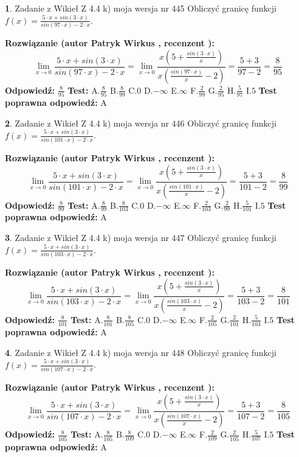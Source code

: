\documentclass[12pt, a4paper]{article}
\theoremstyle{definition} %
\newtheorem{zad}{}
\newcommand{\zadStart}[1]{\begin{zad}#1\newline}
\newcommand{\zadStop}{\end{zad}}
\newcommand{\rozwStart}[2]{\noindent \textbf{Rozwiązanie (autor #1 , recenzent #2): }\newline}
\newcommand{\rozwStop}{\newline}
\newcommand{\odpStart}{\noindent \textbf{Odpowiedź:}\newline}
\newcommand{\odpStop}{\newline}
\newcommand{\testStart}{\noindent \textbf{Test:}\newline}
\newcommand{\testStop}{\newline}
\newcommand{\kluczStart}{\noindent \textbf{Test poprawna odpowiedź:}\newline}
\newcommand{\kluczStop}{\newline}
\begin{document}
\zadStart{Zadanie z Wikieł Z 4.4 k) moja wersja nr 445}
Obliczyć granicę funkcji $f(x)=\frac{5\cdot x +sin(3\cdot x)}{sin(97\cdot x) -2\cdot x}$.
\zadStop
\rozwStart{Patryk Wirkus}{}
$$\lim\limits_{x\to 0}\frac{5\cdot x +sin(3\cdot x)}{sin(97\cdot x) -2\cdot x}
=\lim\limits_{x\to 0}\frac{x(5+\frac{sin(3\cdot x)}{x})}{x(\frac{sin(97\cdot x)}{x}-2)}
=\frac{5+3}{97-2} = \frac{8}{95}$$
\rozwStop
\odpStart
$\frac{8}{95}$
\odpStop
\testStart
A.$\frac{8}{95}$
B.$\frac{8}{99}$
C.$0$
D.$-\infty$
E.$\infty$
F.$\frac{2}{99}$
G.$\frac{2}{95}$
H.$\frac{5}{97}$
I.$5$
\testStop
\kluczStart
A
\kluczStop



\zadStart{Zadanie z Wikieł Z 4.4 k) moja wersja nr 446}
Obliczyć granicę funkcji $f(x)=\frac{5\cdot x +sin(3\cdot x)}{sin(101\cdot x) -2\cdot x}$.
\zadStop
\rozwStart{Patryk Wirkus}{}
$$\lim\limits_{x\to 0}\frac{5\cdot x +sin(3\cdot x)}{sin(101\cdot x) -2\cdot x}
=\lim\limits_{x\to 0}\frac{x(5+\frac{sin(3\cdot x)}{x})}{x(\frac{sin(101\cdot x)}{x}-2)}
=\frac{5+3}{101-2} = \frac{8}{99}$$
\rozwStop
\odpStart
$\frac{8}{99}$
\odpStop
\testStart
A.$\frac{8}{99}$
B.$\frac{8}{103}$
C.$0$
D.$-\infty$
E.$\infty$
F.$\frac{2}{103}$
G.$\frac{2}{99}$
H.$\frac{5}{101}$
I.$5$
\testStop
\kluczStart
A
\kluczStop



\zadStart{Zadanie z Wikieł Z 4.4 k) moja wersja nr 447}
Obliczyć granicę funkcji $f(x)=\frac{5\cdot x +sin(3\cdot x)}{sin(103\cdot x) -2\cdot x}$.
\zadStop
\rozwStart{Patryk Wirkus}{}
$$\lim\limits_{x\to 0}\frac{5\cdot x +sin(3\cdot x)}{sin(103\cdot x) -2\cdot x}
=\lim\limits_{x\to 0}\frac{x(5+\frac{sin(3\cdot x)}{x})}{x(\frac{sin(103\cdot x)}{x}-2)}
=\frac{5+3}{103-2} = \frac{8}{101}$$
\rozwStop
\odpStart
$\frac{8}{101}$
\odpStop
\testStart
A.$\frac{8}{101}$
B.$\frac{8}{105}$
C.$0$
D.$-\infty$
E.$\infty$
F.$\frac{2}{105}$
G.$\frac{2}{101}$
H.$\frac{5}{103}$
I.$5$
\testStop
\kluczStart
A
\kluczStop



\zadStart{Zadanie z Wikieł Z 4.4 k) moja wersja nr 448}
Obliczyć granicę funkcji $f(x)=\frac{5\cdot x +sin(3\cdot x)}{sin(107\cdot x) -2\cdot x}$.
\zadStop
\rozwStart{Patryk Wirkus}{}
$$\lim\limits_{x\to 0}\frac{5\cdot x +sin(3\cdot x)}{sin(107\cdot x) -2\cdot x}
=\lim\limits_{x\to 0}\frac{x(5+\frac{sin(3\cdot x)}{x})}{x(\frac{sin(107\cdot x)}{x}-2)}
=\frac{5+3}{107-2} = \frac{8}{105}$$
\rozwStop
\odpStart
$\frac{8}{105}$
\odpStop
\testStart
A.$\frac{8}{105}$
B.$\frac{8}{109}$
C.$0$
D.$-\infty$
E.$\infty$
F.$\frac{2}{109}$
G.$\frac{2}{105}$
H.$\frac{5}{107}$
I.$5$
\testStop
\kluczStart
A
\kluczStop
\end{document}
